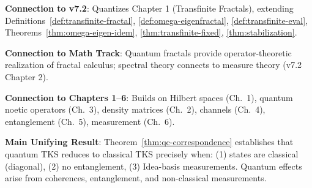 \begin{tcolorbox}[colback=green!5!white,colframe=green!50!black,title=\textbf{Handoff: Next Steps},breakable]
\textbf{Connection to v7.2}: Quantizes Chapter 1 (Transfinite Fractals), extending Definitions~\ref{def:transfinite-fractal}, \ref{def:omega-eigenfractal}, \ref{def:transfinite-eval}, Theorems~\ref{thm:omega-eigen-idem}, \ref{thm:transfinite-fixed}, \ref{thm:stabilization}.

\textbf{Connection to Math Track}: Quantum fractals provide operator-theoretic realization of fractal calculus; spectral theory connects to measure theory (v7.2 Chapter 2).

\textbf{Connection to Chapters 1--6}: Builds on Hilbert spaces (Ch.~1), quantum noetic operators (Ch.~3), density matrices (Ch.~2), channels (Ch.~4), entanglement (Ch.~5), measurement (Ch.~6).

\textbf{Main Unifying Result}: Theorem~\ref{thm:qc-correspondence} establishes that quantum TKS reduces to classical TKS precisely when: (1) states are classical (diagonal), (2) no entanglement, (3) Idea-basis measurements. Quantum effects arise from coherences, entanglement, and non-classical measurements.
\end{tcolorbox}

